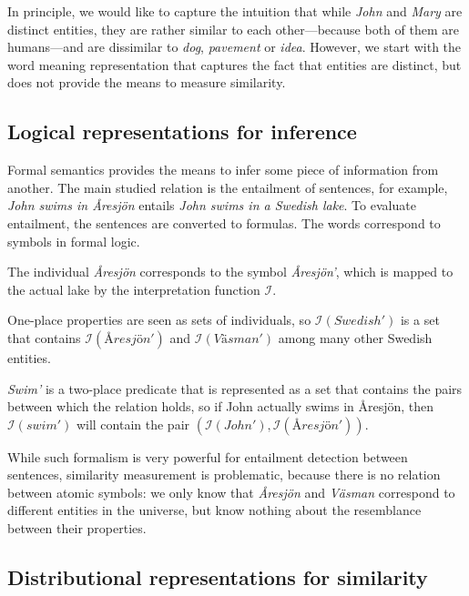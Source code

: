In principle, we would like to capture the intuition that while \textit{John} and \textit{Mary} are distinct entities, they are rather similar to each other---because both of them are humans---and are dissimilar to \textit{dog}, \textit{pavement} or \textit{idea}. However, we start with the word meaning representation that captures the fact that entities are distinct, but does not provide the means to measure similarity.

\subsection{Logical representations for inference}
\label{sec:classical-approaches}

Formal semantics provides the means to infer some piece of information from another. The main studied relation is the entailment of sentences, for example, \textit{John swims in Åresjön} entails \textit{John swims in a Swedish lake}. To evaluate entailment, the sentences are converted to formulas. The words correspond to symbols in formal logic.

The individual \textit{Åresjön} corresponds to the symbol \textit{Åresjön'}, which is mapped to the actual lake by the interpretation function $\mathcal{I}$.

One-place properties are seen as sets of individuals, so $\mathcal{I}(\mathit{Swedish'})$ is a set that contains $\mathcal{I}(\mathit{Åresjön'})$ and $\mathcal{I}(\mathit{Väsman'})$ among many other Swedish entities.

\textit{Swim'} is a two-place predicate that is represented as a set that contains the pairs between which the relation holds, so if John actually swims in Åresjön, then $\mathcal{I}(\mathit{swim'})$ will contain the pair $(\mathcal{I}(\mathit{John'}), \mathcal{I}(\mathit{Åresjön'}))$.

While such formalism is very powerful for entailment detection between sentences, similarity measurement is problematic, because there is no relation between atomic symbols: we only know that \textit{Åresjön} and \textit{Väsman} correspond to different entities in the universe, but know nothing about the resemblance between their properties.

\subsection{Distributional representations for similarity}
\label{sec:distributional-representations}

